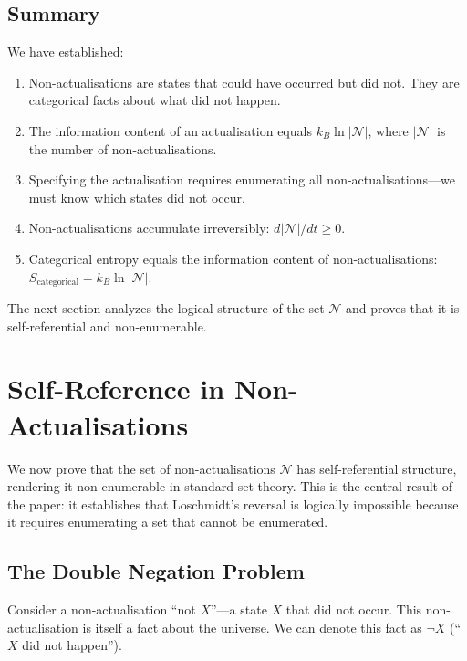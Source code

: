 \documentclass[twocolumn,10pt]{article}
\theoremstyle{definition}
\theoremstyle{remark}
\begin{document}
\subsection{Summary}

We have established:

\begin{enumerate}
\item Non-actualisations are states that could have occurred but did not. They are categorical facts about what did not happen.

\item The information content of an actualisation equals $k_B \ln |\mathcal{N}|$, where $|\mathcal{N}|$ is the number of non-actualisations.

\item Specifying the actualisation requires enumerating all non-actualisations—we must know which states did not occur.

\item Non-actualisations accumulate irreversibly: $d|\mathcal{N}|/dt \geq 0$.

\item Categorical entropy equals the information content of non-actualisations: $S_{\text{categorical}} = k_B \ln |\mathcal{N}|$.
\end{enumerate}

The next section analyzes the logical structure of the set $\mathcal{N}$ and proves that it is self-referential and non-enumerable.

\section{Self-Reference in Non-Actualisations}
\label{sec:self_reference}

We now prove that the set of non-actualisations $\mathcal{N}$ has self-referential structure, rendering it non-enumerable in standard set theory. This is the central result of the paper: it establishes that Loschmidt's reversal is logically impossible because it requires enumerating a set that cannot be enumerated.

\subsection{The Double Negation Problem}

Consider a non-actualisation ``not $X$''—a state $X$ that did not occur. This non-actualisation is itself a fact about the universe. We can denote this fact as $\neg X$ (``$X$ did not happen'').
\end{document}
